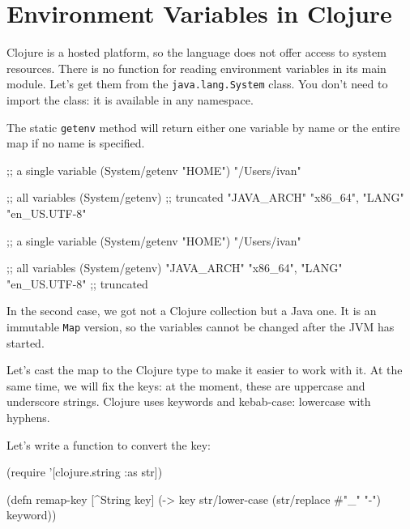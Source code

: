 \section{ Environment Variables in Clojure}


Clojure is a hosted platform, so the language does not offer access to system resources. There is no function for reading environment variables in its main module. Let's get them from the \verb|java.lang.System| class. You don't need to import the class: it is available in any namespace.

The static \verb|getenv| method will return either one variable by name or the entire map if no name is specified.

\ifx\DEVICETYPE\MOBILE

\begin{english}
  \begin{clojure}
;; a single variable
(System/getenv "HOME")
"/Users/ivan"

;; all variables
(System/getenv)
;; truncated
{"JAVA_ARCH" "x86_64",
 "LANG" "en_US.UTF-8"}
  \end{clojure}
\end{english}

\else

\begin{english}
  \begin{clojure}
;; a single variable
(System/getenv "HOME")
"/Users/ivan"

;; all variables
(System/getenv)
{"JAVA_ARCH" "x86_64", "LANG" "en_US.UTF-8"} ;; truncated
  \end{clojure}
\end{english}

\fi

In the second case, we got not a Clojure collection but a Java one. It is an immutable \verb|Map| version, so the variables cannot be changed after the JVM has started.

Let's cast the map to the Clojure type to make it easier to work with it. At the same time, we will fix the keys: at the moment, these are uppercase and underscore strings. Clojure uses keywords and kebab-case: lowercase with hyphens.

Let's write a function to convert the key:

\begin{english}
  \begin{clojure}
(require '[clojure.string :as str])

(defn remap-key [^String key]
  (-> key
      str/lower-case
      (str/replace #"_" "-")
      keyword))
  \end{clojure}
\end{english}

